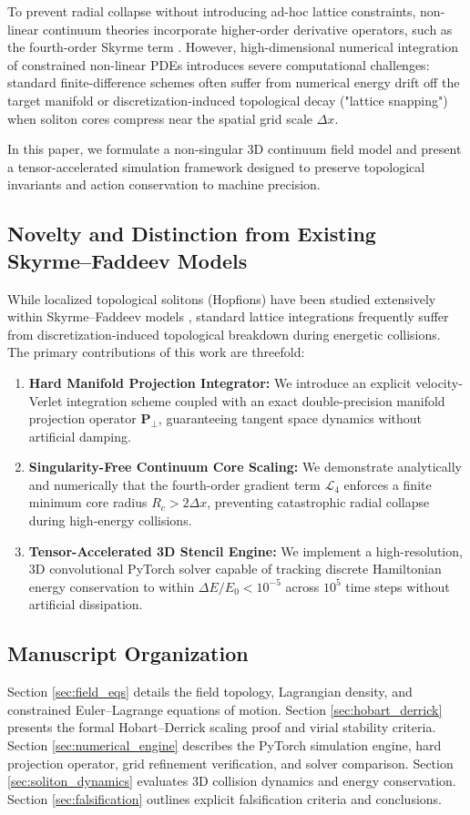 \documentclass[11pt,a4paper]{article}
\begin{document}
	To prevent radial collapse without introducing ad-hoc lattice constraints, non-linear continuum theories incorporate higher-order derivative operators, such as the fourth-order Skyrme term \cite{Skyrme1961, Faddeev1997}. However, high-dimensional numerical integration of constrained non-linear PDEs introduces severe computational challenges: standard finite-difference schemes often suffer from numerical energy drift off the target manifold or discretization-induced topological decay ("lattice snapping") when soliton cores compress near the spatial grid scale $\Delta x$.
	
	In this paper, we formulate a non-singular 3D continuum field model and present a tensor-accelerated simulation framework designed to preserve topological invariants and action conservation to machine precision.
	
	\subsection{Novelty and Distinction from Existing Skyrme--Faddeev Models}
	While localized topological solitons (Hopfions) have been studied extensively within Skyrme--Faddeev models \cite{Faddeev1997, Battye1998}, standard lattice integrations frequently suffer from discretization-induced topological breakdown during energetic collisions. The primary contributions of this work are threefold:
	\begin{enumerate}
		\item \textbf{Hard Manifold Projection Integrator:} We introduce an explicit velocity-Verlet integration scheme coupled with an exact double-precision manifold projection operator $\mathbf{P}_\perp$, guaranteeing tangent space dynamics without artificial damping.
		\item \textbf{Singularity-Free Continuum Core Scaling:} We demonstrate analytically and numerically that the fourth-order gradient term $\mathcal{L}_4$ enforces a finite minimum core radius $R_c > 2\Delta x$, preventing catastrophic radial collapse during high-energy collisions.
		\item \textbf{Tensor-Accelerated 3D Stencil Engine:} We implement a high-resolution, 3D convolutional PyTorch solver capable of tracking discrete Hamiltonian energy conservation to within $\Delta E / E_0 < 10^{-5}$ across $10^5$ time steps without artificial dissipation.
	\end{enumerate}
	
	\subsection{Manuscript Organization}
	Section \ref{sec:field_eqs} details the field topology, Lagrangian density, and constrained Euler--Lagrange equations of motion. Section \ref{sec:hobart_derrick} presents the formal Hobart--Derrick scaling proof and virial stability criteria. Section \ref{sec:numerical_engine} describes the PyTorch simulation engine, hard projection operator, grid refinement verification, and solver comparison. Section \ref{sec:soliton_dynamics} evaluates 3D collision dynamics and energy conservation. Section \ref{sec:falsification} outlines explicit falsification criteria and conclusions.
	
\end{document}
